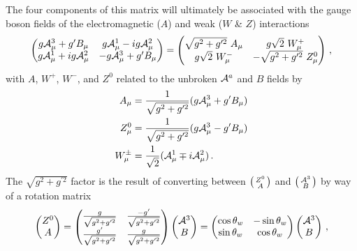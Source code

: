    The four components of this matrix will ultimately be associated with the 
        gauge boson fields of the electromagnetic ($A$) and weak ($W$ \& $Z$) interactions
    \begin{equation} \begin{split}
        \label{eq:electroweak_matrix}
        \begin{pmatrix} 
            g\wField^3_{\mu} + g'B_{\mu} & g\wField^1_{\mu} - ig\wField^2_{\mu} \\
            g\wField^1_{\mu} + ig\wField^2_{\mu} & -g\wField^3_{\mu} + g'B_{\mu}
        \end{pmatrix} =
        \begin{pmatrix} 
            \sqrt{g^2 + g^{\prime 2}}\ A_{\mu} & g \sqrt{2}\ W^+_{\mu} \\
            g \sqrt{2}\ W^-_{\mu} & - \sqrt{g^2 + g^{\prime 2}}\ Z^0_{\mu}
        \end{pmatrix}
        \,,
    \end{split} \end{equation}
    with $A$, $W^+$, $W^-$, and $Z^0$ related to the unbroken $\mathcal{A}^a$ and $B$ fields by
    \begin{equation} \begin{split}
        A_{\mu} & = \frac{1}{\sqrt{g^2 + g^{\prime 2}}} ( g\mathcal{A}^3_{\mu} + g'B_{\mu} ) \\
        Z^0_{\mu} & = \frac{1}{\sqrt{g^2 + g^{\prime 2}}} ( g\mathcal{A}^3_{\mu} - g'B_{\mu} ) \\
        W^{\pm}_{\mu} & = \frac{1}{\sqrt{2}} (\mathcal{A}^1_{\mu} \mp i\mathcal{A}^2_{\mu})
        \,.
    \end{split} \end{equation}
    The $\sqrt{g^2 + g^{\prime 2}}$ factor is the result of converting between
        $\big(\begin{smallmatrix} Z^0 \\ A \end{smallmatrix}\big)$ and $\big(\begin{smallmatrix} \mathcal{A}^3 \\ B \end{smallmatrix}\big)$ by way of a rotation matrix
    \begin{equation} \begin{split}
        \begin{pmatrix} Z^0 \\ A \end{pmatrix} =
        \begin{pmatrix}
            \frac{g}{\sqrt{g^2 + g^{\prime 2}}} & \frac{-g'}{\sqrt{g^2 + g^{\prime 2}}} \\
            \frac{g'}{\sqrt{g^2 + g^{\prime 2}}} & \frac{g}{\sqrt{g^2 + g^{\prime 2}}}
        \end{pmatrix} \begin{pmatrix} \mathcal{A}^3 \\ B \end{pmatrix} = 
        \begin{pmatrix}
            \cos\theta_w & -\sin\theta_w \\
            \sin\theta_w & \cos\theta_w
        \end{pmatrix} \begin{pmatrix} \mathcal{A}^3 \\ B \end{pmatrix}
        \,,
    \end{split} \end{equation}
